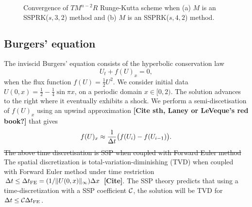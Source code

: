\begin{figure}
	\centering
    \caption{Convergence of $TM^{n-2}R$ Runge-Kutta scheme when (a) $M$ 
    is an SSPRK($s,3,2$) method and (b) $ M $ is an SSPRK($s,4,2$) method.}
    \label{fig:conv_study}
\end{figure}


\subsection{Burgers' equation}\label{subsubsec:burgers}

The inviscid Burgers' equation consists of the hyperbolic conservation law
\begin{equation}\label{eq:HCL}
    U_{t} + f(U)_{x} = 0,
\end{equation}
when the flux function $f(U) = \frac{1}{2}U^{2}$. 
We consider initial data
    $U(0,x)  = \frac{1}{2} - \frac{1}{4}\sin{\pi x}$,
on a periodic domain $x \in [0,2)$.
The solution advances to the right where it eventually exhibits a shock. 
We perform a semi-discetisation of $f(U)_{x}$ using an upwind approximation 
\textbf{[Cite sth, Laney or LeVeque's red book?]} that gives
\begin{equation}\label{eq:burgers_flux}
    f(U)_{x} \approx \frac{1}{\Delta t}\bigl(f(U_{i}) - f(U_{i-1})\bigr).
\end{equation}
\sout{
The above time discretisation is SSP when coupled with Forward Euler method
}
The spatial discretization is total-variation-diminishing (TVD) when
coupled with Forward Euler method under time restriction
$\Delta t \leq {\Delta t}_{\text{FE}} = (1 / \|U(0,x)\|_{\infty}) \Delta x$
\textbf{[Cite]}.
The SSP theory predicts that using a time-discretization with a SSP
coefficient $\mathcal{C}$, the solution will be TVD for $\Delta t \leq
\mathcal{C} {\Delta t}_{\text{FE}}$.


